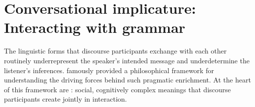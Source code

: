 \documentclass[leqno,12pt]{article}
\begin{document}



\section{Conversational implicature: Interacting with grammar}\label{sec:introduction}

The linguistic forms that discourse participants exchange with each
other routinely underrepresent the speaker's intended message and
underdetermine the listener's inferences. \citet{Grice75} famously
provided a philosophical framework for understanding the driving
forces behind such pragmatic enrichment. At the heart of this
framework are : social, cognitively
complex meanings that discourse participants create jointly in
interaction.
\end{document}
